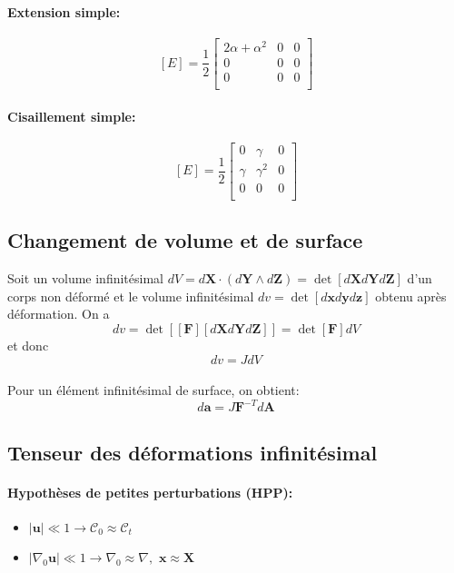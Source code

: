 \paragraph{Extension simple:}
$$[E]=\frac{1}{2}
\left[\begin{array}{ccc}
2\alpha+\alpha^2&0&0\\
0&0&0\\
0&0&0\\
\end{array}\right]$$
\paragraph{Cisaillement simple:}
$$[E]=\frac{1}{2}
\left[\begin{array}{ccc}
0&\gamma&0\\
\gamma&\gamma^2&0\\
0&0&0\\
\end{array}\right]$$

\subsection{Changement de volume et de surface}
Soit un volume infinitésimal $dV=d\textbf{X}\cdot(d\textbf{Y}\wedge d\textbf{Z})=\det[d\textbf{X}d\textbf{Y}d\textbf{Z}]$ d'un corps non déformé et le volume infinitésimal $dv=\det[d\textbf{x}d\textbf{y}d\textbf{z}]$ obtenu après déformation. On a
$$dv=\det[[\textbf{F}][d\textbf{X}d\textbf{Y}d\textbf{Z}]]=\det[\textbf{F}]dV$$
et donc $$dv=JdV$$
\paragraph{}
Pour un élément infinitésimal de surface, on obtient: $$d\textbf{a}=J\textbf{F}^{-T}d\textbf{A}$$

\subsection{Tenseur des déformations infinitésimal}
\label{défo_infinit}
\paragraph{Hypothèses de petites perturbations (HPP):}
\begin{itemize}
\item $|\textbf{u}|\ll 1\longrightarrow \mathcal{C}_0\approx \mathcal{C}_t$
\item $|\nabla_0\textbf{u}|\ll 1\longrightarrow \nabla_0\approx\nabla,\,\,\textbf{x}\approx\textbf{X}$
\end{itemize}

